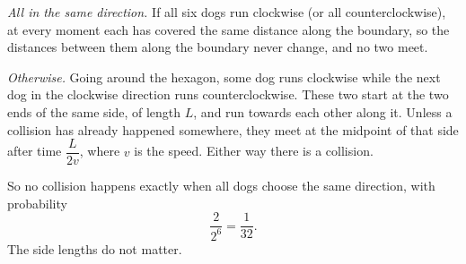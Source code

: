 \emph{All in the same direction.} If all six dogs run clockwise (or all counterclockwise), at every moment each has covered the same distance along the boundary, so the distances between them along the boundary never change, and no two meet.

\emph{Otherwise.} Going around the hexagon, some dog runs clockwise while the next dog in the clockwise direction runs counterclockwise. These two start at the two ends of the same side, of length $L$, and run towards each other along it. Unless a collision has already happened somewhere, they meet at the midpoint of that side after time $\dfrac{L}{2v}$, where $v$ is the speed. Either way there is a collision.

So no collision happens exactly when all dogs choose the same direction, with probability
\[\dfrac{2}{2^6}=\boxed{\dfrac1{32}}.\]
The side lengths do not matter.
